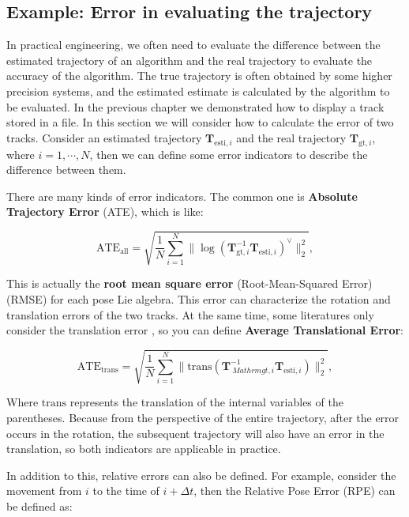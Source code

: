 \subsection{Example: Error in evaluating the trajectory}

In practical engineering, we often need to evaluate the difference between the estimated trajectory of an algorithm and the real trajectory to evaluate the accuracy of the algorithm. The true trajectory is often obtained by some higher precision systems, and the estimated estimate is calculated by the algorithm to be evaluated. In the previous chapter we demonstrated how to display a track stored in a file. In this section we will consider how to calculate the error of two tracks. Consider an estimated trajectory $\bm{T}_{\mathrm{esti}, i}$ and the real trajectory $\bm{T}_{\mathrm{gt},i}$, where $i=1,\cdots , N$, then we can define some error indicators to describe the difference between them.

There are many kinds of error indicators. The common one is \textbf{Absolute Trajectory Error} (ATE), which is like:

\begin{equation}
\mathrm{ATE}_{\mathrm{all}} = \sqrt{ \frac{1}{N} \sum_{i=1}^N \| \log( \bm{T}_{\mathrm{gt },i}^{-1} \bm{T}_{\mathrm{esti},i} )^{\vee} \|_2^2},
\end{equation}

This is actually the \textbf{root mean square error} (Root-Mean-Squared Error) (RMSE) for each pose Lie algebra. This error can characterize the rotation and translation errors of the two tracks. At the same time, some literatures only consider the translation error \cite{Sturm2012}, so you can define \textbf{Average Translational Error}:

\begin{equation}
\mathrm{ATE}_{\mathrm{trans}} = \sqrt{ \frac{1}{N} \sum_{i=1}^N \| \mathrm{trans}( \bm{T}_{\ Mathrm{gt},i}^{-1} \bm{T}_{\mathrm{esti},i} ) \|_2^2},
\end{equation}

Where $\mathrm{trans}$ represents the translation of the internal variables of the parentheses. Because from the perspective of the entire trajectory, after the error occurs in the rotation, the subsequent trajectory will also have an error in the translation, so both indicators are applicable in practice.

In addition to this, relative errors can also be defined. For example, consider the movement from $i$ to the time of $i+\Delta t$, then the Relative Pose Error (RPE) can be defined as:

